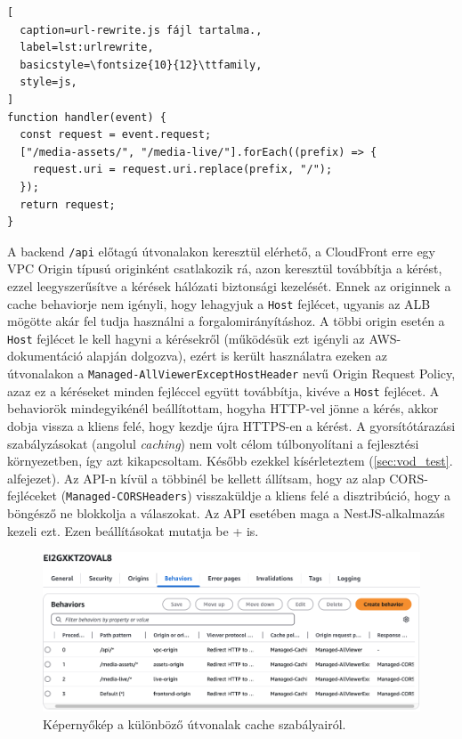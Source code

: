 \begin{minipage}{0.92\textwidth}
  \begin{lstlisting}[
  caption=url-rewrite.js fájl tartalma.,
  label=lst:urlrewrite,
  basicstyle=\fontsize{10}{12}\ttfamily,
  style=js,
]
function handler(event) {
  const request = event.request;
  ["/media-assets/", "/media-live/"].forEach((prefix) => {
    request.uri = request.uri.replace(prefix, "/");
  });
  return request;
}
\end{lstlisting}
\end{minipage}

A backend \verb|/api| előtagú útvonalakon keresztül elérhető, a CloudFront erre egy VPC Origin típusú originként csatlakozik rá, azon keresztül továbbítja a kérést, ezzel leegyszerűsítve a kérések hálózati biztonsági kezelését. Ennek az originnek a cache behaviorje nem igényli, hogy lehagyjuk a \verb|Host| fejlécet, ugyanis az ALB mögötte akár fel tudja használni a forgalomirányításhoz. A többi origin esetén a \verb|Host| fejlécet le kell hagyni a kérésekről (működésük ezt igényli az AWS-dokumentáció alapján dolgozva), ezért is került használatra ezeken az útvonalakon a \verb|Managed-AllViewerExceptHostHeader| nevű Origin Request Policy, azaz ez a kéréseket minden fejléccel együtt továbbítja, kivéve a \verb|Host| fejlécet. A behaviorök mindegyikénél beállítottam, hogyha HTTP-vel jönne a kérés, akkor dobja vissza a kliens felé, hogy kezdje újra HTTPS-en a kérést. A gyorsítótárazási szabályzásokat (angolul \emph{caching}) nem volt célom túlbonyolítani a fejlesztési környezetben, így azt kikapcsoltam. Később ezekkel kísérleteztem (\ref{sec:vod_test}. alfejezet). Az API-n kívül a többinél be kellett állítsam, hogy az alap CORS-fejléceket (\verb|Managed-CORSHeaders|) visszaküldje a kliens felé a disztribúció, hogy a böngésző ne blokkolja a válaszokat. Az API esetében maga a NestJS-alkalmazás kezeli ezt. Ezen beállításokat mutatja be \az+ is.

\begin{figure}[h]
  \centering
  \includegraphics[width=150mm, keepaspectratio]{figures/distro_behav.png}
  \caption{Képernyőkép a különböző útvonalak cache szabályairól.}
  \label{fig:behav}
\end{figure}

